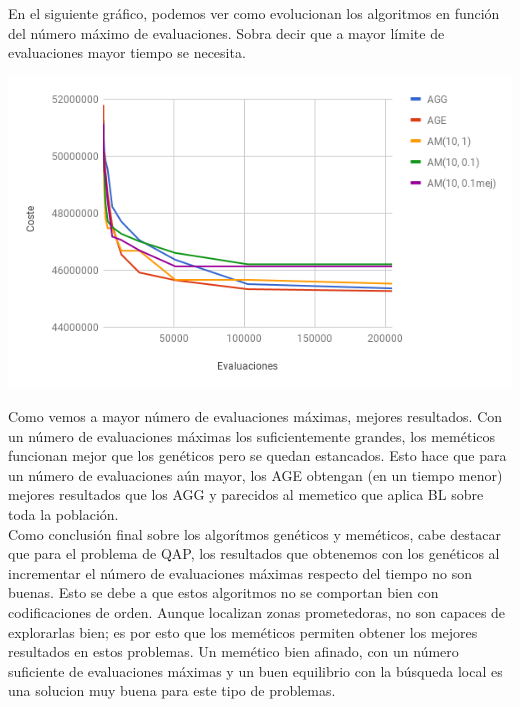 \documentclass[a4paper, 12pt]{article}
\begin{document}
	\newpage
	En el siguiente gráfico, podemos ver como evolucionan los algoritmos en función del número máximo de evaluaciones. Sobra decir que a mayor límite de evaluaciones mayor tiempo se necesita.\\
	
	\begin{center}
         \includegraphics[scale=0.7]{evals-vs-coste}
      \end{center}
      
      Como vemos a mayor número de evaluaciones máximas, mejores resultados. Con un número de evaluaciones máximas los suficientemente grandes, los meméticos funcionan mejor que los genéticos pero se quedan estancados. Esto hace que para un número de evaluaciones aún mayor, los AGE obtengan (en un tiempo menor) mejores resultados que los AGG y parecidos al memetico que aplica BL sobre toda la población.\\
      
      Como conclusión final sobre los algorítmos genéticos y meméticos, cabe destacar que para el problema de QAP, los resultados que obtenemos con los genéticos al incrementar el número de evaluaciones máximas respecto del tiempo no son buenas. Esto se debe a que estos algoritmos no se comportan bien con codificaciones de orden. Aunque localizan zonas prometedoras, no son capaces de explorarlas bien; es por esto que los meméticos permiten obtener los mejores resultados en estos problemas. Un memético bien afinado, con un número suficiente de evaluaciones máximas y un buen equilibrio con la búsqueda local es una solucion muy buena para este tipo de problemas. 
      
\end{document}
